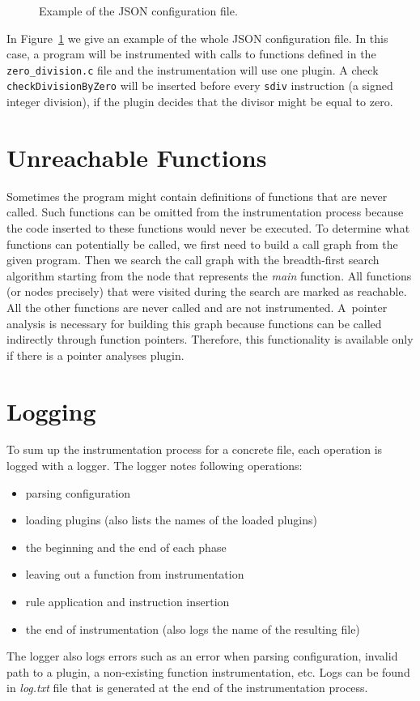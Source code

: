 
\begin{figure}[t]

\caption{Example of the JSON configuration file.}
\label{fig:all_config}
\end{figure}

In Figure~\ref{fig:all_config} we give an example of the whole JSON
configuration file. In this case, a program will be instrumented with calls to
functions defined in the \texttt{zero\_division.c} file and the instrumentation
will use one plugin. A check \texttt{checkDivisionByZero} will be inserted
before every \texttt{sdiv} instruction (a signed integer division), if the
plugin decides that the divisor might be equal to zero.

\section{Unreachable Functions}

Sometimes the program might contain definitions of functions that are never
called. Such functions can be omitted from the instrumentation process because
the code inserted to these functions would never be executed. To determine what
functions can potentially be called, we first need to build a call graph from
the given program. Then we search the call graph with the breadth-first search
algorithm starting from the node that represents the \emph{main} function. All
functions (or nodes precisely) that were visited during the search are marked
as reachable. All the other functions are never called and are not
instrumented. A~pointer analysis is necessary for building this graph because
functions can be called indirectly through function pointers. Therefore, this
functionality is available only if there is a pointer analyses plugin.

\section{Logging}

To sum up the instrumentation process for a concrete file, each operation is
logged with a logger. The logger notes following operations:
\begin{itemize}
  \item parsing configuration
  \item loading plugins (also lists the names of the loaded plugins)
  \item the beginning and the end of each phase
  \item leaving out a function from instrumentation
  \item rule application and instruction insertion
  \item the end of instrumentation (also logs the name of the resulting file)
\end{itemize}
The logger also logs errors such as an error when parsing configuration,
invalid path to a plugin, a non-existing function instrumentation, etc. Logs
can be found in \emph{log.txt} file that is generated at the end of the
instrumentation process.

